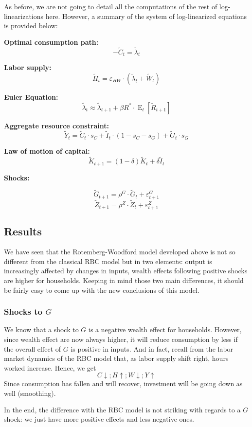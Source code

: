\documentclass[12pt]{report}
\newcommand{\Et}[1]{\operatorname{E}_t\left[#1\right]}
\begin{document}
As before, we are not going to detail all the computations of the rest of log-linearizations here. However, a summary of the  system of log-linearized equations is provided below:

\textbf{Optimal consumption path:} $$ - \tilde C_t = \tilde \lambda_t $$

\textbf{Labor supply:}$$ \tilde H_t = \varepsilon_{HW} \cdot (\tilde\lambda_t + \tilde W_t) $$

\textbf{Euler Equation:}$$\tilde\lambda_t  \approx \tilde\lambda_{t+1} + \beta R^*\cdot\Et{\tilde R_{t+1}}$$

\textbf{Aggregate resource constraint:}$$ \tilde Y_t  = \tilde C_t \cdot s_C + \tilde I_t \cdot (1 - s_C - s_G) + \tilde G_t \cdot s_G $$

\textbf{Law of motion of capital:}$$ \tilde K_{t+1} = (1 - \delta)\tilde K_t + \delta \tilde I_t $$

\textbf{Shocks:}

$$\tilde G_{t+1} = \rho^G\cdot \tilde G_{t} + \varepsilon_{t+1}^G $$
$$\tilde Z_{t+1} = \rho^Z\cdot \tilde Z_{t} + \varepsilon_{t+1}^Z $$

\subsection{Results}

We have seen that the Rotemberg-Woodford model developed above is not so different from the classical RBC model but in two elements: output is increasingly affected by changes in inputs, wealth effects following positive shocks are higher for households. Keeping in mind those two main differences, it should be fairly easy to come up with the new conclusions of this model.

\subsubsection{Shocks to $G$}

We know that a shock to $G$ is a negative wealth effect for households. However, since wealth effect are now always higher, it will reduce consumption by less if the overall effect of $G$ is positive in inputs. And in fact, recall from the labor market dynamics of the RBC model that, as labor supply shift right, hours worked increase. Hence, we get $$C\downarrow ; H\uparrow ; W\downarrow ; Y\uparrow $$
Since consumption has fallen and will recover, investment will be going down as well (smoothing).

In the end, the difference with the RBC model is not striking with regards to a $G$ shock: we just have more positive effects and less negative ones.
\end{document}
